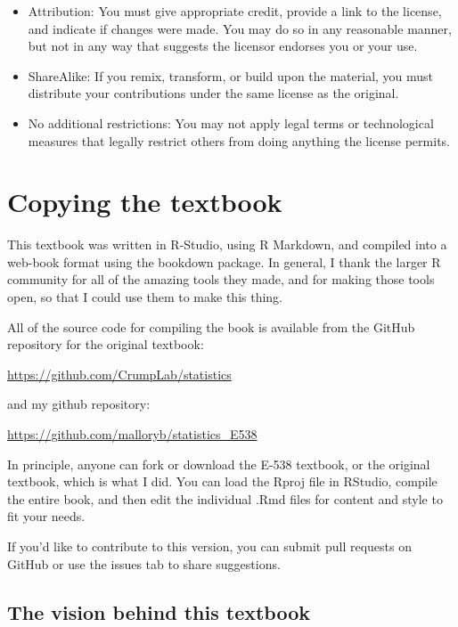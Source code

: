 \documentclass[
  letterpaper,
  DIV=11,
  numbers=noendperiod]{scrreprt}
\providecommand{\tightlist}{%
  \setlength{\itemsep}{0pt}\setlength{\parskip}{0pt}}
\begin{document}
\begin{itemize}
\tightlist
\item
  Attribution: You must give appropriate credit, provide a link to the
  license, and indicate if changes were made. You may do so in any
  reasonable manner, but not in any way that suggests the licensor
  endorses you or your use.
\item
  ShareAlike: If you remix, transform, or build upon the material, you
  must distribute your contributions under the same license as the
  original.
\item
  No additional restrictions: You may not apply legal terms or
  technological measures that legally restrict others from doing
  anything the license permits.
\end{itemize}

\section*{Copying the textbook}\label{copying-the-textbook}


This textbook was written in R-Studio, using R Markdown, and compiled
into a web-book format using the bookdown package. In general, I thank
the larger R community for all of the amazing tools they made, and for
making those tools open, so that I could use them to make this thing.

All of the source code for compiling the book is available from the
GitHub repository for the original textbook:

\url{https://github.com/CrumpLab/statistics}

and my github repository:

\url{https://github.com/malloryb/statistics_E538}

In principle, anyone can fork or download the E-538 textbook, or the
original textbook, which is what I did. You can load the Rproj file in
RStudio, compile the entire book, and then edit the individual .Rmd
files for content and style to fit your needs.

If you'd like to contribute to this version, you can submit pull
requests on GitHub or use the issues tab to share suggestions.

\subsection*{The vision behind this
textbook}\label{the-vision-behind-this-textbook}
\end{document}
